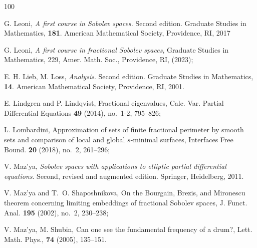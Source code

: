 \documentclass{amsart}
\theoremstyle{definition}
\numberwithin{equation}{section}
\begin{document}
\begin{thebibliography}{100}
	
	  G. Leoni, {\it A first course in Sobolev spaces.} Second edition. Graduate Studies in Mathematics, {\bf 181}. American Mathematical Society, Providence, RI, 2017
	
	 G. Leoni, {\it A first course in fractional Sobolev spaces}, Graduate Studies in Mathematics, 229, Amer. Math. Soc., Providence, RI, (2023);
	
	
	
	 E. H. Lieb, M. Loss, {\it Analysis}. Second edition. Graduate Studies in Mathematics, {\bf 14}. American Mathematical Society, Providence, RI, 2001.
	
	 E. Lindgren and P. Lindqvist, Fractional eigenvalues, Calc. Var. Partial Differential Equations {\bf 49} (2014), no.~1-2, 795--826; 
	
	 L. Lombardini, Approximation of sets of finite fractional perimeter by smooth sets and comparison of local and global $s$-minimal surfaces, Interfaces Free Bound. {\bf 20} (2018), no.~2, 261--296; 
	
	
	
	 V. Maz'ya, {\it Sobolev spaces with applications to elliptic partial differential equations}. Second, revised and augmented edition. Springer, Heidelberg, 2011. 
	
	 V. Maz'ya and T.~O. Shaposhnikova, On the Bourgain, Brezis, and Mironescu theorem concerning limiting embeddings of fractional Sobolev spaces, J. Funct. Anal. {\bf 195} (2002), no.~2, 230--238;
	
	 V. Maz'ya, M. Shubin, Can one see the fundamental frequency of a drum?, Lett. Math. Phys., {\bf 74} (2005), 135--151.
	

\end{thebibliography}
\end{document}
